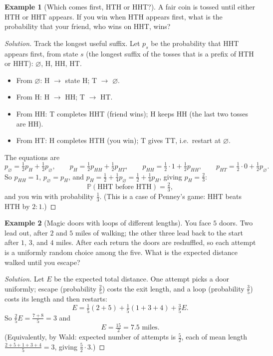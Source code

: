 \documentclass[11pt]{article}
\theoremstyle{definition}
\newtheorem{example}{Example}[section]
\begin{document}
\begin{example}[Which comes first, HTH or HHT?]
A fair coin is tossed until either HTH or HHT appears. If you win when HTH appears first, what is the probability that your friend, who wins on HHT, wins?
\end{example}

\begin{proof}[Solution]
Track the longest useful suffix. Let $p_s$ be the probability that HHT appears first, from state $s$ (the longest suffix of the tosses that is a prefix of HTH or HHT): $\varnothing$, H, HH, HT.

\begin{itemize}
    \item From $\varnothing$: H $\to$ state H; T $\to$ $\varnothing$.
    \item From H: H $\to$ HH; T $\to$ HT.
    \item From HH: T completes HHT (friend wins); H keeps HH (the last two tosses are HH).
    \item From HT: H completes HTH (you win); T gives TT, i.e.\ restart at $\varnothing$.
\end{itemize}
The equations are
\[
p_\varnothing=\tfrac12p_H+\tfrac12p_\varnothing,\qquad p_H=\tfrac12p_{HH}+\tfrac12p_{HT},\qquad p_{HH}=\tfrac12\cdot1+\tfrac12p_{HH},\qquad p_{HT}=\tfrac12\cdot0+\tfrac12p_\varnothing.
\]
So $p_{HH}=1$, $p_\varnothing=p_H$, and $p_H=\tfrac12+\tfrac14p_\varnothing=\tfrac12+\tfrac14p_H$, giving $p_H=\tfrac23$:
\[
\boxed{\mathbb P(\text{HHT before HTH})=\tfrac23},
\]
and you win with probability $\tfrac13$. (This is a case of Penney's game: HHT beats HTH by $2:1$.)
\end{proof}

\begin{example}[Magic doors with loops of different lengths]
You face $5$ doors. Two lead out, after $2$ and $5$ miles of walking; the other three lead back to the start after $1$, $3$, and $4$ miles. After each return the doors are reshuffled, so each attempt is a uniformly random choice among the five. What is the expected distance walked until you escape?
\end{example}

\begin{proof}[Solution]
Let $E$ be the expected total distance. One attempt picks a door uniformly; escape (probability $\tfrac25$) costs the exit length, and a loop (probability $\tfrac35$) costs its length and then restarts:
\[
E=\tfrac15(2+5)+\tfrac15(1+3+4)+\tfrac35E.
\]
So $\tfrac25E=\tfrac{7+8}5=3$ and
\[
\boxed{E=\tfrac{15}2=7.5\text{ miles}}.
\]
(Equivalently, by Wald: expected number of attempts is $\tfrac52$, each of mean length $\tfrac{2+5+1+3+4}5=3$, giving $\tfrac52\cdot3$.)
\end{proof}
\end{document}
